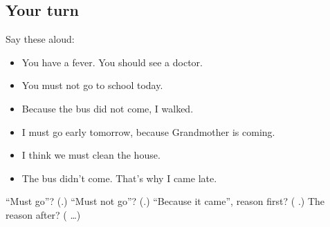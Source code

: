 \subsection*{Your turn}
Say these aloud:

\begin{itemize}
\raggedright
  \item You have a fever. You should see a doctor.
  \item You must not go to school today.
  \item Because the bus did not come, I walked.
  \item I must go early tomorrow, because Grandmother is coming.
  \item I think we must clean the house.
  \item The bus didn't come. That's why I came late.
\end{itemize}

\begin{tcolorbox}[breakable,colback=teal!4,colframe=teal!35!black,title={Before you move on}]
\textquotedblleft{}Must go\textquotedblright{}? (\textbf{}.) \textquotedblleft{}Must not go\textquotedblright{}? (\textbf{}.) \textquotedblleft{}Because it came\textquotedblright{}, reason first? (\textbf{ }.) The reason after? (\textbf{} …)
\end{tcolorbox}

